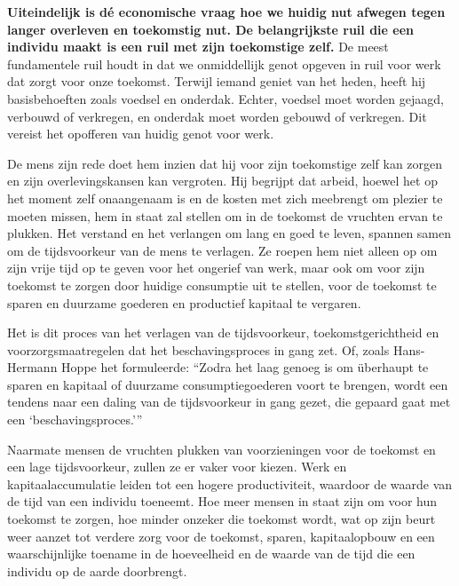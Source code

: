 \textbf{Uiteindelijk is dé economische vraag hoe we huidig nut afwegen
tegen langer overleven en toekomstig nut. De belangrijkste ruil die een
individu maakt is een ruil met zijn toekomstige zelf.} De meest fundamentele
ruil houdt in dat we onmiddellijk genot opgeven in ruil voor
werk dat zorgt voor onze toekomst. Terwijl iemand geniet van het heden,
heeft hij basisbehoeften zoals voedsel en onderdak. Echter, voedsel moet worden gejaagd, verbouwd of verkregen, en onderdak moet worden gebouwd of verkregen. Dit vereist het opofferen van huidig genot voor werk.

De mens zijn rede doet hem inzien dat hij voor zijn toekomstige zelf kan
zorgen en zijn overlevingskansen kan vergroten. Hij begrijpt dat arbeid,
hoewel het op het moment zelf onaangenaam is en de kosten met zich
meebrengt om plezier te moeten missen, hem in staat zal stellen om in de
toekomst de vruchten ervan te plukken. Het verstand en het verlangen om
lang en goed te leven, spannen samen om de tijdsvoorkeur van de mens te
verlagen. Ze roepen hem niet alleen op om zijn vrije tijd op te geven
voor het ongerief van werk, maar ook om voor zijn toekomst te zorgen
door huidige consumptie uit te stellen, voor de toekomst te sparen en
duurzame goederen en productief kapitaal te vergaren.

Het is dit proces van het verlagen van de tijdsvoorkeur,
toekomstgerichtheid en voorzorgsmaatregelen dat het beschavingsproces in
gang zet. Of, zoals Hans-Hermann Hoppe het formuleerde: \enquote{Zodra het laag
genoeg is om überhaupt te sparen en kapitaal of duurzame
consumptiegoederen voort te brengen, wordt een tendens naar een daling
van de tijdsvoorkeur in gang gezet, die gepaard gaat met een
`beschavingsproces.'}\autocite{36}

Naarmate mensen de vruchten plukken van voorzieningen voor de toekomst
en een lage tijdsvoorkeur, zullen ze er vaker voor kiezen. Werk en
kapitaalaccumulatie leiden tot een hogere productiviteit, waardoor
de waarde van de tijd van een individu toeneemt. Hoe meer mensen in
staat zijn om voor hun toekomst te zorgen, hoe minder onzeker die
toekomst wordt, wat op zijn beurt weer aanzet tot verdere zorg voor de
toekomst, sparen, kapitaalopbouw en een waarschijnlijke toename in de
hoeveelheid en de waarde van de tijd die een individu op de aarde
doorbrengt.

